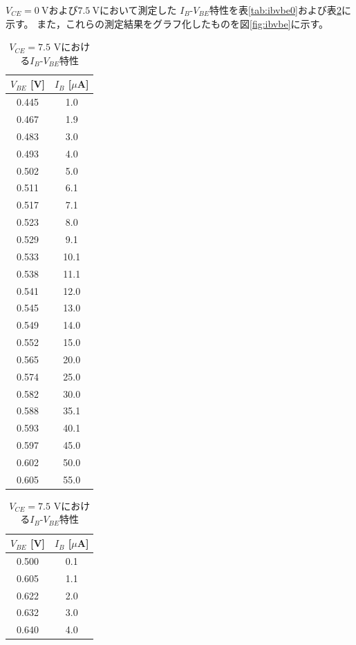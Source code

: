\documentclass[11pt,a4paper]{jsarticle}
\begin{document}
$V_{CE}=0~\mathrm{V}$および$7.5~\mathrm{V}$において測定した
$I_B$-$V_{BE}$特性を表\ref{tab:ibvbe0}および表\ref{tab:ibvbe75}に示す。
また，これらの測定結果をグラフ化したものを図\ref{fig:ibvbe}に示す。

\begin{table}[H]
\centering

\begin{minipage}[t]{0.47\textwidth}
\centering
\caption{$V_{CE}=0$ Vにおける$I_B$-$V_{BE}$特性}
\label{tab:ibvbe0}
\small
\begin{tabular}{cc}
\toprule
$V_{BE}$ [V] & $I_B$ [$\mu$A]\\
\midrule
0.445 & 1.0\\
0.467 & 1.9\\
0.483 & 3.0\\
0.493 & 4.0\\
0.502 & 5.0\\
0.511 & 6.1\\
0.517 & 7.1\\
0.523 & 8.0\\
0.529 & 9.1\\
0.533 & 10.1\\
0.538 & 11.1\\
0.541 & 12.0\\
0.545 & 13.0\\
0.549 & 14.0\\
0.552 & 15.0\\
0.565 & 20.0\\
0.574 & 25.0\\
0.582 & 30.0\\
0.588 & 35.1\\
0.593 & 40.1\\
0.597 & 45.0\\
0.602 & 50.0\\
0.605 & 55.0\\
\bottomrule
\end{tabular}
\end{minipage}
\hfill
\begin{minipage}[t]{0.47\textwidth}
\centering
\caption{$V_{CE}=7.5$ Vにおける$I_B$-$V_{BE}$特性}
\label{tab:ibvbe75}
\small
\begin{tabular}{cc}
\toprule
$V_{BE}$ [V] & $I_B$ [$\mu$A]\\
\midrule
0.500 & 0.1\\
0.605 & 1.1\\
0.622 & 2.0\\
0.632 & 3.0\\
0.640 & 4.0\\

\end{tabular}
\end{minipage}
\end{table}
\end{document}
